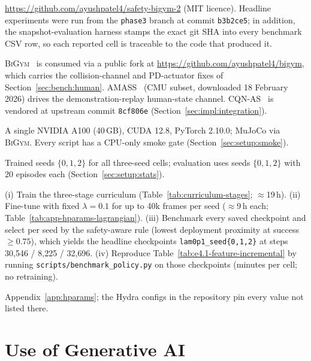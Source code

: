 \documentclass[11pt,a4paper]{report}
\newcommand{\bigym}{\textsc{BiGym}}
\newcommand{\cqnas}{CQN-AS}
\begin{document}
\begin{description}[leftmargin=2em,style=nextline]
\item[Code] \url{https://github.com/ayushpatel4/safety-bigym-2} (MIT
  licence). Headline experiments were run from the \texttt{phase3}
  branch at commit \texttt{b3b2ce5}; in addition, the
  snapshot-evaluation harness stamps the exact git SHA into every
  benchmark CSV row, so each reported cell is traceable to the code
  that produced it.
\item[Upstream assets] \bigym{}~\cite{chernyadev2024bigym} is consumed
  via a public fork at \url{https://github.com/ayushpatel4/bigym},
  which carries the collision-channel and PD-actuator fixes of
  Section~\ref{sec:bench:human}. AMASS~\cite{mahmood2019amass} (CMU
  subset, downloaded 18 February 2026) drives the demonstration-replay
  human-state channel. \cqnas{}~\cite{seo2024cqnas} is vendored at
  upstream commit \texttt{8cf806e}
  (Section~\ref{sec:impl:integration}).
\item[Hardware and software] A single NVIDIA A100 (40\,GB), CUDA 12.8,
  PyTorch 2.10.0; MuJoCo via \bigym{}. Every script has a CPU-only
  smoke gate (Section~\ref{sec:setup:smoke}).
\item[Seeds] Trained seeds $\{0, 1, 2\}$ for all three-seed cells;
  evaluation uses seeds $\{0, 1, 2\}$ with 20 episodes each
  (Section~\ref{sec:setup:stats}).
\item[Headline recipe] (i) Train the three-stage curriculum
  (Table~\ref{tab:curriculum-stages}; $\approx$19\,h). (ii) Fine-tune
  with fixed $\lambda = 0.1$ for up to 40k frames per seed
  ($\approx$9\,h each; Table~\ref{tab:app-hparams-lagrangian}).
  (iii) Benchmark every saved checkpoint and select per seed by the
  safety-aware rule (lowest deployment proximity at success
  $\ge 0.75$), which yields the headline checkpoints
  \texttt{lam0p1\_seed\{0,1,2\}} at steps 30{,}546 / 8{,}225 /
  32{,}696. (iv) Reproduce
  Table~\ref{tab:e4.1-feature-incremental} by running
  \texttt{scripts/benchmark\_policy.py} on those checkpoints
  (minutes per cell; no retraining).
\item[Hyperparameters] Appendix~\ref{app:hparams}; the Hydra configs
  in the repository pin every value not listed there.
\end{description}

\chapter{Use of Generative AI}
\label{app:genai}
\end{document}
